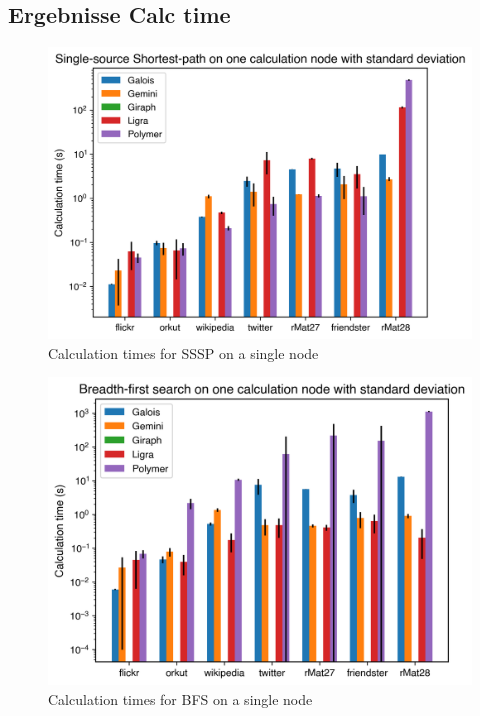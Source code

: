 \subsection{Ergebnisse Calc time}
\begin{figure}
	\includegraphics[width=\columnwidth]{../../plots/singleNodeSSSP_calcTime.png}
	\caption{Calculation times for SSSP on a single node}
	\label{fig:singleNodeSSSP_calc}
\end{figure}

\begin{figure}
	\includegraphics[width=\columnwidth]{../../plots/singleNodeBFS_calcTime.png}
	\caption{Calculation times for BFS on a single node}
	\label{fig:singleNodeBFS_calc}
\end{figure}


